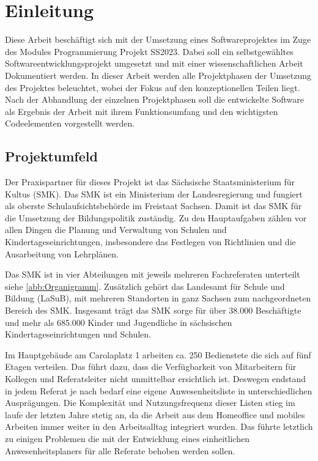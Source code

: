 \section{Einleitung}
\label{sec:Einleitung}
Diese Arbeit beschäftigt sich mit der Umsetzung eines Softwareprojektes im Zuge des Modules Programmierung Projekt SS2023. Dabei soll ein selbstgewähltes Softwareentwicklungsprojekt umgesetzt und mit einer wissenschaftlichen Arbeit Dokumentiert werden. In dieser Arbeit werden alle Projektphasen der Umsetzung des Projektes beleuchtet, wobei der Fokus auf den konzeptionellen Teilen liegt. Nach der Abhandlung der einzelnen Projektphasen soll die entwickelte Software als Ergebnis der Arbeit mit ihrem Funktionsumfang und den wichtigsten Codeelementen vorgestellt werden.

\subsection{Projektumfeld}
\label{sec:Projektumfeld}
Der Praxispartner für dieses Projekt ist das Sächsische Staatsministerium für Kultus (SMK). Das SMK ist ein Ministerium der Landesregierung und fungiert als oberste Schulaufsichtsbehörde im Freistaat Sachsen. Damit ist das SMK für die Umsetzung der Bildungspolitik zuständig. Zu den Hauptaufgaben zählen vor allen Dingen die Planung und Verwaltung von Schulen und Kindertageseinrichtungen, insbesondere das Festlegen von Richtlinien und die Ausarbeitung von Lehrplänen.

Das SMK ist in vier Abteilungen mit jeweils mehreren Fachreferaten unterteilt siehe \ref{abb:Organigramm}. Zusätzlich gehört das Landesamt für Schule und Bildung (LaSuB), mit mehreren Standorten in ganz Sachsen zum nachgeordneten Bereich des SMK. Insgesamt trägt das SMK sorge für über 38.000 Beschäftigte und mehr als 685.000 Kinder und Jugendliche in sächsischen Kindertageseinrichtungen und Schulen.

Im Hauptgebäude am Carolaplatz 1 arbeiten ca. 250 Bedienstete die sich auf fünf Etagen verteilen. Das führt dazu, dass die Verfügbarkeit von Mitarbeitern für Kollegen und Referatsleiter nicht unmittelbar ersichtlich ist. Deswegen endstand in jedem Referat je nach bedarf eine eigene Anwesenheitsliste in unterschiedlichen Ausprägungen. Die Komplexität und Nutzungsfrequenz dieser Listen stieg im laufe der letzten Jahre stetig an, da die Arbeit aus dem Homeoffice und mobiles Arbeiten immer weiter in den Arbeitsalltag integriert wurden. Das führte letztlich zu einigen Problemen die mit der Entwicklung eines einheitlichen Anwesenheitsplaners für alle Referate behoben werden sollen.

